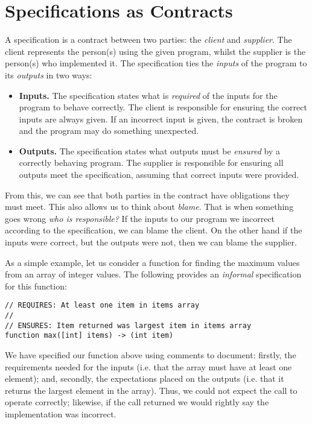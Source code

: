 \section{Specifications as Contracts}
A specification is a contract between two parties: the {\em client} and {\em supplier}.  The client represents the person(s) using the given program, whilst the supplier is the person(s) who implemented it.  The specification ties the {\em inputs} of the program to its {\em outputs} in two ways:
\begin{itemize}
\item {\bf Inputs.} The specification states what is {\em required} of the inputs for the program to behave correctly.  The client is responsible for ensuring the correct inputs are always given.  If an incorrect input is given, the contract is broken and the program may do something unexpected.
\item {\bf Outputs.} The specification states what outputs must be {\em ensured} by a correctly behaving program.  The supplier is responsible for ensuring all outputs meet the specification, assuming that correct inputs were provided.
\end{itemize}
From this, we can see that both parties in the contract have obligations they must meet.  This also allows us to think about {\em blame}.  That is when something goes wrong {\em who is responsible?}  If the inputs to our program we incorrect according to the specification, we can blame the client.  On the other hand if the inputs were correct, but the outputs were not, then we can blame the supplier.

\begin{eg}
As a simple example, let us consider a function for finding the maximum values from an array of integer values.  The following provides an {\em informal} specification for this function:
\begin{tcolorbox}\begin{lstlisting}[language=Whiley]
// REQUIRES: At least one item in items array
//
// ENSURES: Item returned was largest item in items array
function max([int] items) -> (int item)
\end{lstlisting}\end{tcolorbox}
We have specified our function above using comments to document: firstly, the requirements needed for the inputs (i.e. that the array must have at least one element); and, secondly, the expectations placed on the outputs (i.e. that it returns the largest element in the array).  Thus, we could not expect the call  to operate correctly; likewise, if the call  returned  we would rightly say the implementation was incorrect.
\end{eg}

